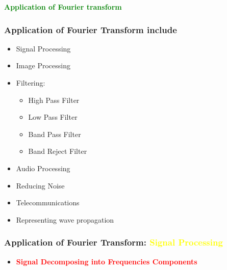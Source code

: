 \documentclass[aspectratio=1610]{beamer}
\begin{document}
\begin{frame}
    \textcolor{green}{\textbf{Application of Fourier transform}}
\end{frame}

\begin{frame}
    \frametitle{Application of Fourier Transform include}
    \begin{itemize}[label=$\star$, itemsep=7pt, parsep=0pt, topsep=10pt]
      \item<1-> Signal Processing
      \item<2-> Image Processing
      \item<3-> Filtering: 
          \begin{itemize}
              \item<4-> High Pass Filter 
              \item<5-> Low Pass Filter 
              \item<6-> Band Pass Filter
              \item <7-> Band Reject Filter
          \end{itemize}
      \item<8-> Audio Processing
      \item<9-> Reducing Noise
      \item<10-> Telecommunications
      \item<12-> Representing wave propagation
    \end{itemize}
  \end{frame}
  
  \begin{frame}
    \frametitle{Application of Fourier Transform: \textcolor{yellow}{Signal Processing}}
    \begin{itemize} [label=$\star$, itemsep=4pt, parsep=0pt, topsep=10pt]
        \item<1-> \textbf{\textcolor{red}{Signal Decomposing into Frequencies Components}}
    \end{itemize}
  \end{frame}
  
\end{document}
